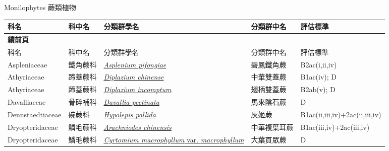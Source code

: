 \noindent\normalfont\selectfont Monilophytes 蕨類植物
\footnotesize\selectfont
        {\def\arraystretch{1.5}\tabcolsep=2pt
        \begin{longtable}{p{2.5cm}p{2.5cm}p{4.5cm}p{2.5cm}p{3cm}}
        \toprule
          科名 & 科中名 & 分類群學名 & 分類群中名 & 評估標準 \\
        \midrule 
        \endfirsthead

        {{\bfseries 續前頁 }} \\
        科名 & 科中名 & 分類群學名 & 分類群中名 & 評估標準 \\
        \midrule
        \endhead
                Aspleniaceae & 鐵角蕨科 & \href{http://www.theplantlist.org/tpl1.1/search?q=Asplenium+pifongiae}{\textit{Asplenium pifongiae} } & 碧鳳鐵角蕨 & B2ac(i,ii,iv) \index{Asplenium@\textit{Asplenium}!pifongiae@\textit{pifongiae}}  \index{碧鳳鐵角蕨} \\
    Athyriaceae & 蹄蓋蕨科 & \href{http://www.theplantlist.org/tpl1.1/search?q=Diplazium+chinense}{\textit{Diplazium chinense} } & 中華雙蓋蕨 & B1ac(iv); D \index{Diplazium@\textit{Diplazium}!chinense@\textit{chinense}}  \index{中華雙蓋蕨} \\
    Athyriaceae & 蹄蓋蕨科 & \href{http://www.theplantlist.org/tpl1.1/search?q=Diplazium+incomptum}{\textit{Diplazium incomptum} } & 翅柄雙蓋蕨 & B2ab(v); D \index{Diplazium@\textit{Diplazium}!incomptum@\textit{incomptum}}  \index{翅柄雙蓋蕨} \\
    Davalliaceae & 骨碎補科 & \href{http://www.theplantlist.org/tpl1.1/search?q=Davallia+pectinata}{\textit{Davallia pectinata} } & 馬來陰石蕨 & D \index{Davallia@\textit{Davallia}!pectinata@\textit{pectinata}}  \index{馬來陰石蕨} \\
    Dennstaedtiaceae & 碗蕨科 & \href{http://www.theplantlist.org/tpl1.1/search?q=Hypolepis+pallida}{\textit{Hypolepis pallida} } & 灰姬蕨 & B1ac(ii,iii,iv)+2ac(ii,iii,iv) \index{Hypolepis@\textit{Hypolepis}!pallida@\textit{pallida}}  \index{灰姬蕨} \\
    Dryopteridaceae & 鱗毛蕨科 & \href{http://www.theplantlist.org/tpl1.1/search?q=Arachniodes+chinensis}{\textit{Arachniodes chinensis} } & 中華複葉耳蕨 & B1ac(iii,iv)+2ac(iii,iv) \index{Arachniodes@\textit{Arachniodes}!chinensis@\textit{chinensis}}  \index{中華複葉耳蕨} \\
    Dryopteridaceae & 鱗毛蕨科 & \href{http://www.theplantlist.org/tpl1.1/search?q=Cyrtomium+macrophyllum+var.+macrophyllum}{\textit{Cyrtomium macrophyllum} var. \textit{macrophyllum} } & 大葉貫眾蕨 & D \index{Cyrtomium@\textit{Cyrtomium}!macrophyllum@\textit{macrophyllum}!var. macrophyllum@var. \textit{macrophyllum}}  \index{大葉貫眾蕨} \\

\end{longtable}}
